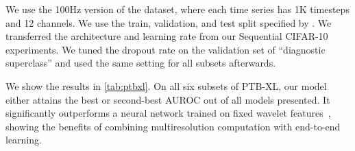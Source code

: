 \documentclass{article}
\theoremstyle{plain}
\theoremstyle{definition}
\theoremstyle{remark}
\begin{document}
We use the 100Hz version of the dataset, where each time series has 1K timesteps and 12 channels.
We use the train, validation, and test split specified by \citet{Strodthoff2021DeepLearningECG}. 
We transferred the architecture and learning rate from our Sequential CIFAR-10 experiments. 
We tuned the dropout rate on the validation set of ``diagnostic superclass'' and used the same setting for all subsets afterwards. 

We show the results in \cref{tab:ptbxl}.
On all six subsets of PTB-XL, our model either attains the best or second-best AUROC out of all models presented.
It significantly outperforms a neural network trained on fixed wavelet features~\citep{Strodthoff2021DeepLearningECG}, 
showing the benefits of combining multiresolution computation with end-to-end learning.
\end{document}
